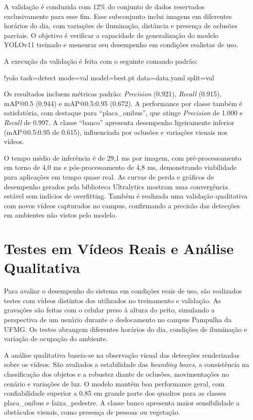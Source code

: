A validação é conduzida com 12\% do conjunto de dados reservados exclusivamente para esse fim. Esse subconjunto inclui imagens em diferentes horários do dia, com variações de iluminação, distância e presença de oclusões parciais. O objetivo é verificar a capacidade de generalização do modelo YOLOv11 treinado e mensurar seu desempenho em condições realistas de uso.

A execução da validação é feita com o seguinte comando padrão:

!yolo task=detect mode=val model=best.pt data=data.yaml split=val

Os resultados incluem métricas padrão: \textit{Precision} (0.921), \textit{Recall} (0.915), mAP@0.5 (0.944) e mAP@0.5:0.95 (0.672). A performance por classe também é satisfatória, com destaque para “placa\_onibus”, que atinge \textit{Precision} de 1.000 e \textit{Recall} de 0.997. A classe “banco” apresenta desempenho ligeiramente inferior (mAP@0.5:0.95 de 0.615), influenciada por oclusões e variações visuais nos vídeos.

O tempo médio de inferência é de 29,1 ms por imagem, com pré-processamento em torno de 4,0 ms e pós-processamento de 4,8 ms, demonstrando viabilidade para aplicações em tempo quase real. As curvas de perda e gráficos de desempenho gerados pela biblioteca Ultralytics mostram uma convergência estável sem indícios de overfitting. Também é realizada uma validação qualitativa com novos vídeos capturados no campus, confirmando a precisão das detecções em ambientes não vistos pelo modelo.

\section{Testes em Vídeos Reais e Análise Qualitativa}

Para avaliar o desempenho do sistema em condições reais de uso, são realizados testes com vídeos distintos dos utilizados no treinamento e validação. As gravações são feitas com o celular preso à altura do peito, simulando a perspectiva de um usuário durante o deslocamento no campus Pampulha da UFMG. Os testes abrangem diferentes horários do dia, condições de iluminação e variação de ocupação do ambiente.

A análise qualitativa baseia-se na observação visual das detecções renderizadas sobre os vídeos. São avaliados a estabilidade das \textit{bounding boxes}, a consistência na classificação dos objetos e a robustez diante de oclusões, movimentações no cenário e variações de luz. O modelo mantém boa performance geral, com confiabilidade superior a 0.85 em grande parte dos quadros para as classes placa\_onibus e faixa\_pedestre. A classe banco apresenta maior sensibilidade a obstáculos visuais, como presença de pessoas ou vegetação.

